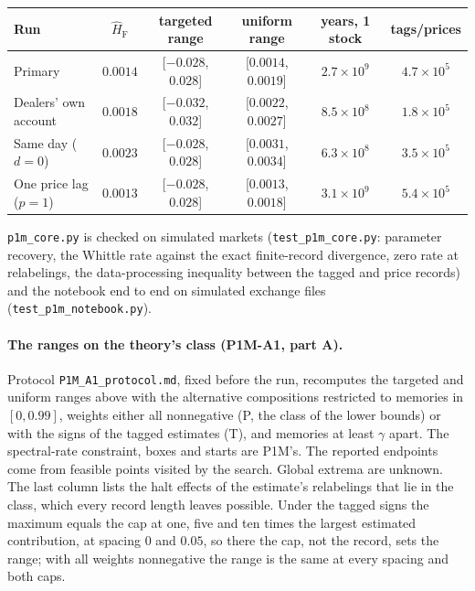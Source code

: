 \documentclass[12pt]{article}
\theoremstyle{definition}
\theoremstyle{remark}
\begin{document}
\begin{center}\footnotesize\setlength{\tabcolsep}{4pt}
\begin{tabular}{lccccc}\toprule
Run & $\hat H_{\mathrm{F}}$ & targeted range & uniform range & years, 1 stock & tags/prices\\\midrule
Primary & $0.0014$ & [$-0.028$, $0.028$] & [$0.0014$, $0.0019$] & $2.7\times10^{9}$ & $4.7\times10^{5}$\\
Dealers' own account & $0.0018$ & [$-0.032$, $0.032$] & [$0.0022$, $0.0027$] & $8.5\times10^{8}$ & $1.8\times10^{5}$\\
Same day ($d=0$) & $0.0023$ & [$-0.028$, $0.028$] & [$0.0031$, $0.0034$] & $6.3\times10^{8}$ & $3.5\times10^{5}$\\
One price lag ($p=1$) & $0.0013$ & [$-0.028$, $0.028$] & [$0.0013$, $0.0018$] & $3.1\times10^{9}$ & $5.4\times10^{5}$\\
\bottomrule\end{tabular}
\end{center}

\nolinkurl{p1m_core.py} is checked on simulated markets (\nolinkurl{test_p1m_core.py}: parameter recovery, the Whittle rate against the exact finite-record divergence, zero rate at relabelings, the data-processing inequality between the tagged and price records) and the notebook end to end on simulated exchange files (\nolinkurl{test_p1m_notebook.py}).

\paragraph{The ranges on the theory's class (P1M-A1, part A).} Protocol \nolinkurl{P1M_A1_protocol.md}, fixed before the run, recomputes the targeted and uniform ranges above with the alternative compositions restricted to memories in $[0,0.99]$, weights either all nonnegative (P, the class of the lower bounds) or with the signs of the tagged estimates (T), and memories at least $\gamma$ apart. The spectral-rate constraint, boxes and starts are P1M's. The reported endpoints come from feasible points visited by the search. Global extrema are unknown. The last column lists the halt effects of the estimate's relabelings that lie in the class, which every record length leaves possible. Under the tagged signs the maximum equals the cap at one, five and ten times the largest estimated contribution, at spacing $0$ and $0.05$, so there the cap, not the record, sets the range; with all weights nonnegative the range is the same at every spacing and both caps.
\end{document}
